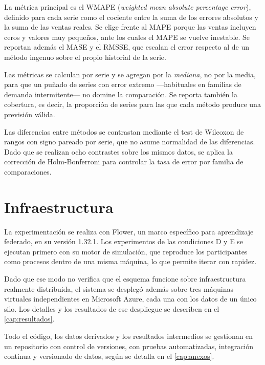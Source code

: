La métrica principal es el WMAPE (\emph{weighted mean absolute percentage error}), definido para
cada serie como el cociente entre la suma de los errores absolutos y la suma de las ventas reales.
Se elige frente al MAPE porque las ventas incluyen ceros y valores muy pequeños, ante los cuales el
MAPE se vuelve inestable. Se reportan además el MASE y el RMSSE, que escalan el error respecto al
de un método ingenuo sobre el propio historial de la serie.

Las métricas se calculan por serie y se agregan por la \emph{mediana}, no por la media, para que un
puñado de series con error extremo —habituales en familias de demanda intermitente— no domine la
comparación. Se reporta también la cobertura, es decir, la proporción de series para las que cada
método produce una previsión válida.

Las diferencias entre métodos se contrastan mediante el test de Wilcoxon de rangos con signo
pareado por serie, que no asume normalidad de las diferencias. Dado que se realizan ocho contrastes
sobre los mismos datos, se aplica la corrección de Holm-Bonferroni para controlar la tasa de error
por familia de comparaciones.

\section{Infraestructura}

La experimentación se realiza con Flower, un marco específico para aprendizaje federado, en su
versión 1.32.1. Los experimentos de las condiciones D y E se ejecutan primero con su motor de
simulación, que reproduce los participantes como procesos dentro de una misma máquina, lo que
permite iterar con rapidez.

Dado que ese modo no verifica que el esquema funcione sobre infraestructura realmente distribuida,
el sistema se desplegó además sobre tres máquinas virtuales independientes en Microsoft Azure, cada
una con los datos de un único silo. Los detalles y los resultados de ese despliegue se describen en
el \cref{cap:resultados}.

Todo el código, los datos derivados y los resultados intermedios se gestionan en un repositorio con
control de versiones, con pruebas automatizadas, integración continua y versionado de datos, según
se detalla en el \cref{cap:anexos}.
